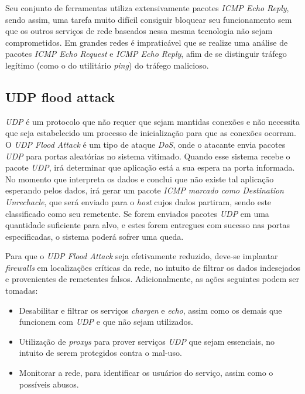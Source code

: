 Seu conjunto de ferramentas utiliza extensivamente pacotes \textit{ICMP Echo Reply}, sendo assim, uma tarefa muito difícil consiguir bloquear seu funcionamento sem que os outros serviços de rede baseados nessa mesma tecnologia não sejam comprometidos. Em grandes redes é impraticável que se realize uma análise de pacotes \textit{ICMP Echo Request} e \textit{ICMP Echo Reply}, afim de se distinguir tráfego legítimo (como o do utilitário \textit{ping}) do tráfego malicioso.


\subsection{UDP flood attack}

\textit{UDP} é um protocolo que não requer que sejam mantidas conexões e não necessita que seja estabelecido um processo de inicialização para que as conexões ocorram. O \textit{UDP Flood Attack} é um tipo de ataque \textit{DoS}, onde o atacante envia pacotes \textit{UDP} para portas aleatórias no sistema vitimado. Quando esse sistema recebe o pacote \textit{UDP}, irá determinar que aplicação está a sua espera na porta informada. No momento que interpreta os dados e conclui que não existe tal aplicação esperando pelos dados, irá gerar um pacote \textit{\textit{ICMP} marcado como Destination Unrechacle}, que será enviado para o \textit{host} cujos dados partiram, sendo este classificado como seu remetente. Se forem enviados pacotes \textit{UDP} em uma quantidade suficiente para alvo, e estes forem entregues com sucesso nas portas especificadas, o sistema poderá sofrer uma queda.

Para que o \textit{UDP Flood Attack} seja efetivamente reduzido, deve-se implantar \textit{firewalls} em localizações críticas da rede, no intuito de filtrar os dados indesejados e provenientes de remetentes falsos. Adicionalmente, as ações seguintes podem ser tomadas:
\begin{itemize}
    \item Desabilitar e filtrar os serviços \textit{chargen} e \textit{echo}, assim como os demais que funcionem com \textit{UDP} e que não sejam utilizados.

    \item Utilização de \textit{proxys} para prover serviços \textit{UDP} que sejam essenciais, no intuito de serem protegidos contra o mal-uso.

    \item Monitorar a rede, para identificar os usuários do serviço, assim como o possíveis abusos.
\end{itemize}




